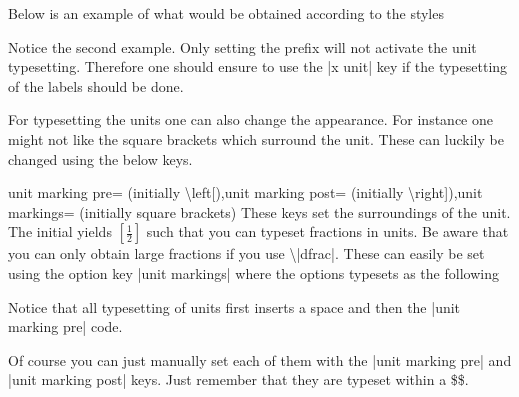 Below is an example of what would be obtained according to the styles
\begin{codeexample}[code only]
\pgfplotsset{use units,x unit=T,xlabel=Temperature,ylabel=Nothing} 
\pgfplotsset{use units,x unit prefix=m,xlabel=Temperature,ylabel=Nothing} 
\end{codeexample}
Notice the second example. Only setting the prefix will not activate the unit typesetting. Therefore one should ensure to use the |x unit| key if the
typesetting of the labels should be done.

For typesetting the units one can also change the appearance. For instance one might not like the square brackets which surround the unit. These can
luckily be changed using the below keys.
\begin{pgfplotskeylist}{unit marking pre= (initially \textbackslash left[),unit marking post= (initially \textbackslash right]),unit markings= (initially square brackets)}
  These keys set the surroundings of the unit. The initial yields $\left[\frac{1}{2}\right]$ such that you can typeset fractions in units. Be aware that
  you can only obtain large fractions if you use \textbackslash|dfrac|. These can easily be set using the option key |unit markings| where the options typesets as the following
\begin{codeexample}
\pgfplotsset{x unit=T,unit markings=parenthesis} %
\pgfplotsset{x unit=T,unit markings=square brackets} %
\pgfplotsset{x unit=T,unit markings=slash space} %
\end{codeexample}
  Notice that all typesetting of units first inserts a space and then the |unit marking pre| code.

  Of course you can just manually set each of them with the |unit marking pre| and |unit marking post| keys. Just remember that they are typeset within a \$\$.
\end{pgfplotskeylist}

